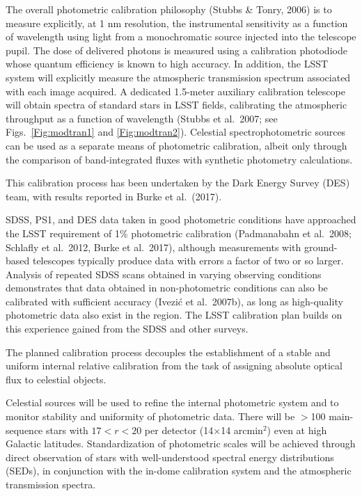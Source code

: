 \documentclass{emulateapj}
\begin{document}

The overall photometric calibration philosophy (Stubbs \& Tonry, 2006) is to measure explicitly, at 1 nm resolution, the 
instrumental sensitivity as a function of wavelength using light from a monochromatic source injected
into the telescope pupil. The dose of delivered photons is measured using a calibration photodiode whose quantum 
efficiency is known to high accuracy. In addition, the LSST system will explicitly measure the atmospheric transmission 
spectrum associated with each image acquired. A
dedicated 1.5-meter auxiliary calibration telescope will obtain spectra of
standard stars in LSST fields, calibrating the atmospheric throughput
as a function of wavelength  (Stubbs et al.~2007; 
see Figs.~\ref{Fig:modtran1} and \ref{Fig:modtran2}). 
Celestial spectrophotometric sources can be used as a separate means of photometric calibration, albeit only through the 
comparison of band-integrated fluxes with synthetic photometry calculations. 

This calibration process has been undertaken by the Dark Energy Survey (DES) team, with results reported in Burke et al.~(2017).   

SDSS, PS1, and DES data 
taken in good photometric conditions have approached the LSST
requirement of 1\% photometric calibration
(Padmanabahn et al.~2008; Schlafly et al.~2012, Burke et al.~2017), although measurements with ground-based telescopes 
typically produce data with errors a factor of two or so larger. Analysis of
repeated SDSS scans obtained in varying observing conditions demonstrates that data
obtained in 
non-photometric conditions can also be calibrated with
sufficient accuracy (Ivezi\'{c} et al.~2007b), as long as high-quality
photometric data also exist in the region. 
The LSST calibration plan builds on this experience gained from the SDSS and other surveys. 

The planned calibration process decouples the establishment of a stable and uniform internal 
relative calibration from the task of assigning absolute optical flux to 
celestial objects. 

Celestial sources will be used to refine the internal photometric system and 
to monitor stability and uniformity of photometric data. There will be 
$>$100 main-sequence stars with $17<r<20$ per detector (14$\times$14 arcmin$^2$) 
even at high Galactic latitudes. Standardization of photometric scales will be 
achieved through direct observation of stars with well-understood spectral 
energy distributions (SEDs), in conjunction with the in-dome calibration system and the atmospheric transmission spectra. 
\end{document}
